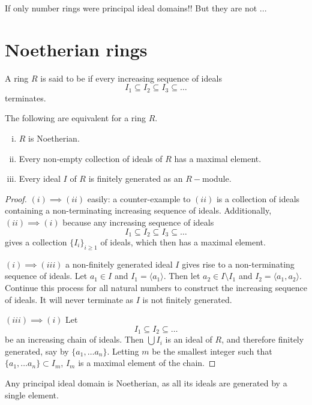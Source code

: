 If only number rings were principal ideal domains!! But they are not ...

\section{Noetherian rings}

\begin{definition}
A ring $R$ is said to be  if every increasing sequence of ideals $$I_1\subseteq I_2\subseteq I_3 \subseteq \dots$$
terminates.
\end{definition}

\begin{proposition}\label{noetherian-module-equivalences}
The following are equivalent for a ring $R$.
\begin{enumerate}[(i)]
    \item $R$ is Noetherian.
    \item Every non-empty collection of ideals of $R$ has a maximal element.
    \item Every ideal $I$ of $R$ is finitely generated as an $R-$module.
\end{enumerate}
\end{proposition}
\begin{proof}
$(i)\implies (ii)$ easily: a counter-example to $(ii)$ is a collection of ideals containing a non-terminating increasing sequence of ideals. Additionally, $(ii)\implies (i)$ because any increasing sequence of ideals
$$I_1\subseteq I_2\subseteq I_3 \subseteq \dots$$
gives a collection $\{I_i\}_{i\geq 1}$ of ideals, which then has a maximal element.

$(i)\implies (iii)$ a non-finitely generated ideal $I$ gives rise to a non-terminating sequence of ideals. Let $a_1\in I$ and $I_1=\langle a_1\rangle$. Then let $a_2\in I\setminus I_1$ and $I_2=\langle a_1,a_2\rangle$. Continue this process for all natural numbers to construct the increasing sequence of ideals. It will never terminate as $I$ is not finitely generated.

$(iii)\implies (i)$ Let $$I_1\subseteq I_2\subseteq \dots$$ be an increasing chain of ideals. Then $\bigcup I_i$ is an ideal of $R$, and therefore finitely generated, say by $\{a_1,\dots a_n\}$. Letting $m$ be the smallest integer such that $\{a_1,\dots a_n\}\subset I_m$, $I_m$ is a maximal element of the chain.

\end{proof}

\begin{example}
Any principal ideal domain is Noetherian, as all its ideals are generated by a single element.
\end{example}

